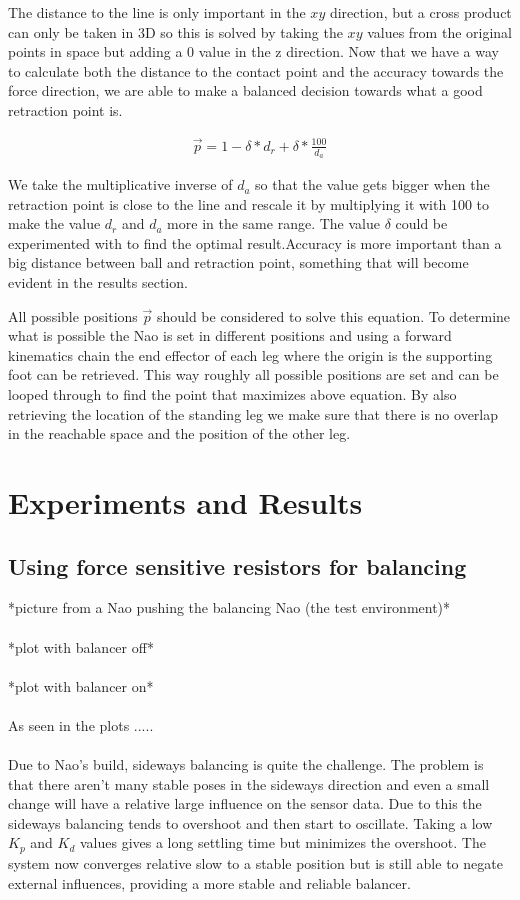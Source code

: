\documentclass[a4paper]{article}
\begin{document}
The distance to the line is only important in the $xy$ direction, but a cross
product can only be taken in 3D so this is solved by taking the $xy$
values from the original points in space but adding a 0 value in the z
direction.
Now that we have a way to calculate both the distance to the contact point and
the accuracy towards the force direction, we are able to make a balanced
decision towards what a good retraction point is.

\begin{align}
    \vec{p} = 1-\delta * d_r + \delta * \frac{100}{d_a}
\label{eq:delta}
\end{align}

We take the multiplicative inverse of $d_a$ so that the value gets bigger when the
retraction point is close to the line and rescale it by multiplying it with 100 to
make the value $d_r$ and $d_a$ more in the same range. The value $\delta$  could
be experimented with to find the optimal result.Accuracy is more important than a big distance between ball and
retraction point, something that will become evident in the results section.

All possible positions $\vec{p}$ should be considered to solve this equation. To
determine what is possible the Nao is set in different positions and using a
forward kinematics chain the end effector of each leg where the origin is the
supporting foot can be retrieved. This way roughly all possible positions are set and can be
looped through to find the point that maximizes above equation. By also
retrieving the location of the standing leg we make sure that there is
no overlap in the reachable space and the position of the other leg.

\section{Experiments and Results}

\subsection{Using force sensitive resistors for balancing}
*picture from a Nao pushing the balancing Nao (the test environment)*\\\\
*plot with balancer off*\\\\
*plot with balancer on*\\\\
As seen in the plots .....\\\\
Due to Nao's build, sideways balancing is quite the challenge.
The problem is that there aren't many stable poses in the sideways direction and even a small change will have a relative large influence on the sensor data.
Due to this the sideways balancing tends to overshoot and then start to oscillate.
Taking a low $K_p$ and $K_d$ values gives a long settling time but minimizes the overshoot.  
The system now converges relative slow to a stable position but is still able to negate external influences, providing a more stable and reliable balancer. 
\end{document}
